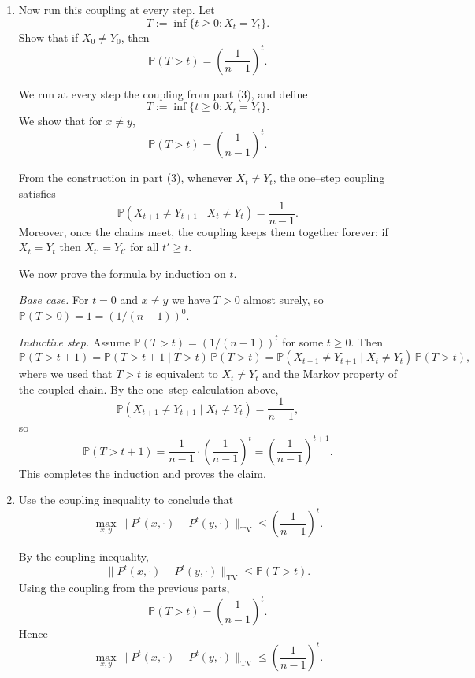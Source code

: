 \documentclass[answers,12pt,addpoints]{exam}
\newcommand{\TV}{\mathrm{TV}}
\begin{document}
\begin{enumerate}
\begin{solution}
Next, we compute the disagreement probability under this coupling.
Disagreement occurs only in the first case, when $(X_1,Y_1) = (y,x)$.
Hence
\[
  \mathbb{P}(X_1 \neq Y_1)
  = \frac{1}{n-1}.
\]
From part (2), we already know that
$\|P(x,\cdot) - P(y,\cdot)\|_{\mathrm{TV}} = \frac{1}{n-1}$, so this
coupling satisfies
\[
  \mathbb{P}(X_1 \neq Y_1)
  = \|P(x,\cdot) - P(y,\cdot)\|_{\mathrm{TV}},
\]
as required. 
\end{solution}

  \item Now run this coupling at every step. Let
  \[
  T := \inf\{t \ge 0 : X_t = Y_t\}.
  \]
  Show that if $X_0 \neq Y_0$, then
  \[
  \mathbb{P}(T > t) = \left(\frac{1}{n-1}\right)^t.
  \]

\begin{solution}
We run at every step the coupling from part (3), and define
\[
  T := \inf\{t \ge 0 : X_t = Y_t\}.
\]
We show that for $x \neq y$,
\[
  \mathbb{P}(T > t) = \left(\frac{1}{n-1}\right)^{t}.
\]

From the construction in part (3), whenever $X_t \neq Y_t$, the one–step
coupling satisfies
\[
  \mathbb{P}(X_{t+1} \neq Y_{t+1} \mid X_t \neq Y_t)
  = \frac{1}{n-1}.
\]
Moreover, once the chains meet, the coupling keeps them together
forever: if $X_t = Y_t$ then $X_{t'} = Y_{t'}$ for all $t' \ge t$.

We now prove the formula by induction on $t$.

\medskip\noindent
\textit{Base case.} For $t=0$ and $x \neq y$ we have $T > 0$
almost surely, so $\mathbb{P}(T>0) = 1 = (1/(n-1))^{0}$.

\medskip\noindent
\textit{Inductive step.} Assume
$\mathbb{P}(T > t) = (1/(n-1))^{t}$ for some $t \ge 0$. Then
\[
  \mathbb{P}(T > t+1)
  = \mathbb{P}(T > t+1 \mid T > t)\,\mathbb{P}(T > t)
  = \mathbb{P}(X_{t+1} \neq Y_{t+1} \mid X_t \neq Y_t)\,
    \mathbb{P}(T > t),
\]
where we used that $T > t$ is equivalent to $X_t \neq Y_t$ and the
Markov property of the coupled chain. By the one–step calculation above,
\[
  \mathbb{P}(X_{t+1} \neq Y_{t+1} \mid X_t \neq Y_t)
  = \frac{1}{n-1},
\]
so
\[
  \mathbb{P}(T > t+1)
  = \frac{1}{n-1} \cdot \left(\frac{1}{n-1}\right)^{t}
  = \left(\frac{1}{n-1}\right)^{t+1}.
\]
This completes the induction and proves the claim. \qedhere
\end{solution}

  \item Use the coupling inequality to conclude that
  \[
  \max_{x,y} \|P^t(x,\cdot) - P^t(y,\cdot)\|_{\TV}
  \le \left(\frac{1}{n-1}\right)^t.
  \]

  \begin{solution}
  By the coupling inequality,
  \[
  \|P^t(x,\cdot)-P^t(y,\cdot)\|_{\TV} \le \mathbb{P}(T>t).
  \]
  Using the coupling from the previous parts,
  \[
  \mathbb{P}(T>t)=\left(\frac{1}{n-1}\right)^t.
  \]
  Hence
  \[
  \max_{x,y} \|P^t(x,\cdot)-P^t(y,\cdot)\|_{\TV}
  \le \left(\frac{1}{n-1}\right)^t.
  \]
  \end{solution}
\end{enumerate}
\end{document}
